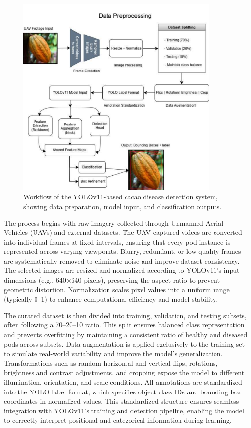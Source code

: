 \begin{figure}[H]
	\centering
	\caption{Workflow of the YOLOv11-based cacao disease detection system, showing data preparation, model input, and classification outputs.}
	\label{fig:Data Preprocessing Workflow}
	\includegraphics[width=0.9\textwidth]{figures/Data Processing.pdf}
\end{figure}

The process begins with raw imagery collected through Unmanned Aerial Vehicles (UAVs) and external datasets. The UAV-captured videos are converted into individual frames at fixed intervals, ensuring that every pod instance is represented across varying viewpoints. Blurry, redundant, or low-quality frames are systematically removed to eliminate noise and improve dataset consistency. The selected images are resized and normalized according to YOLOv11’s input dimensions (e.g., 640×640 pixels), preserving the aspect ratio to prevent geometric distortion. Normalization scales pixel values into a uniform range (typically 0–1) to enhance computational efficiency and model stability.

The curated dataset is then divided into training, validation, and testing subsets, often following a 70–20–10 ratio. This split ensures balanced class representation and prevents overfitting by maintaining a consistent ratio of healthy and diseased pods across subsets. Data augmentation is applied exclusively to the training set to simulate real-world variability and improve the model’s generalization. Transformations such as random horizontal and vertical flips, rotations, brightness and contrast adjustments, and cropping expose the model to different illumination, orientation, and scale conditions. All annotations are standardized into the YOLO label format, which specifies object class IDs and bounding box coordinates in normalized values. This standardized structure ensures seamless integration with YOLOv11’s training and detection pipeline, enabling the model to correctly interpret positional and categorical information during learning.



